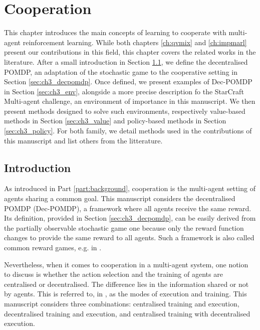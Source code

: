\chapter{Cooperation}\label{ch:cooperation}
\begin{chapter_outline}

This chapter introduces the main concepts of learning to cooperate with multi-agent reinforcement learning.
While both chapters \ref{ch:qvmix} and \ref{ch:impmarl} present our contributions in this field, this chapter covers the related works in the literature.
After a small introduction in Section \ref{sec:ch3_intro}, we define the decentralised POMDP, an adaptation of the stochastic game to the cooperative setting in Section \ref{sec:ch3_decpomdp}.
Once defined, we present examples of Dec-POMDP in Section \ref{sec:ch3_env}, alongside a more precise description fo the StarCraft Multi-agent challenge, an environment of importance in this manuscript.
We then present methods designed to solve such environments, respectively value-based methods in Section \ref{sec:ch3_value} and policy-based methods in Section \ref{sec:ch3_policy}.
For both family, we detail methods used in the contributions of this manuscript and list others from the litterature.

\end{chapter_outline}


\section{Introduction}
\label{sec:ch3_intro}
As introduced in Part \ref{part:background}, cooperation is the multi-agent setting of agents sharing a common goal.
This manuscript considers the decentralised POMDP (Dec-POMDP), a framework where all agents receive the same reward.
Its definition, provided in Section \ref{sec:ch3_decpomdp}, can be easily derived from the partially observable stochastic game one because only the reward function changes to provide the same reward to all agents.
Such a framework is also called common reward games, e.g. in \cite{marl-book}.


Nevertheless, when it comes to cooperation in a multi-agent system, one notion to discuss is whether the action selection and the training of agents are centralised or decentralised.
The difference lies in the information shared or not by agents.
This is referred to, in \citep{marl-book}, as the modes of execution and training.
This manuscript considers three combinations: centralised training and execution, decentralised training and execution, and centralised training with decentralised execution.

